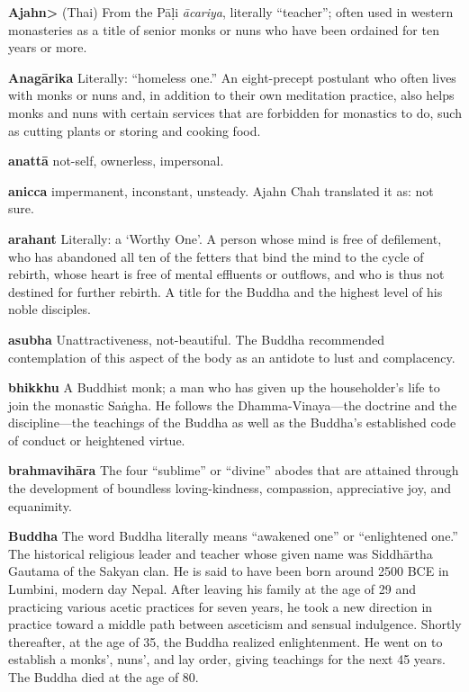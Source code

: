 \textbf{Ajahn>} (Thai) From the Pāḷi \emph{ācariya}, literally 
``teacher''; often used in western monasteries as a title of senior 
monks or nuns who have been ordained for ten years or more.

\textbf{Anagārika} Literally: ``homeless one.'' An eight-precept 
postulant who often lives with monks or nuns and, in addition to their 
own meditation practice, also helps monks and nuns with certain 
services that are forbidden for monastics to do, such as cutting plants 
or storing and cooking food.

\textbf{anattā} not-self, ownerless, impersonal.

\textbf{anicca} impermanent, inconstant, unsteady. Ajahn Chah 
translated it as: not sure.

\textbf{arahant} Literally: a `Worthy One'. A person whose mind is free 
of defilement, who has abandoned all ten of the fetters that bind the 
mind to the cycle of rebirth, whose heart is free of mental effluents 
or outflows, and who is thus not destined for further rebirth. A title 
for the Buddha and the highest level of his noble disciples.

\textbf{asubha} Unattractiveness, not-beautiful. The Buddha recommended 
contemplation of this aspect of the body as an antidote to lust and 
complacency.

\textbf{bhikkhu} A Buddhist monk; a man who has given up the 
householder's life to join the monastic Saṅgha. He follows the 
Dhamma-Vinaya---the doctrine and the discipline---the teachings of the 
Buddha as well as the Buddha's established code of conduct or 
heightened virtue.

\textbf{brahmavihāra} The four ``sublime'' or ``divine'' abodes that 
are attained through the development of boundless loving-kindness, 
compassion, appreciative joy, and equanimity.

\textbf{Buddha} The word Buddha literally means ``awakened one'' or 
``enlightened one.'' The historical religious leader and teacher whose 
given name was Siddhārtha Gautama of the Sakyan clan. He is said to 
have been born around 2500 BCE in Lumbini, modern day Nepal. After 
leaving his family at the age of 29 and practicing various acetic 
practices for seven years, he took a new direction in practice toward a 
middle path between asceticism and sensual indulgence. Shortly 
thereafter, at the age of 35, the Buddha realized enlightenment. He 
went on to establish a monks', nuns', and lay order, giving teachings 
for the next 45 years. The Buddha died at the age of 80.

